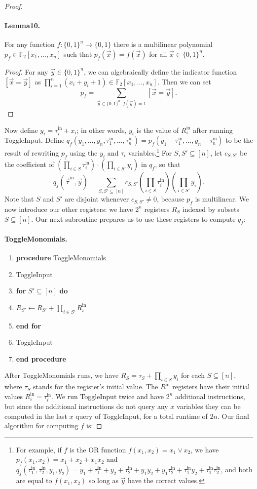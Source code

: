 \begin{proof}
\paragraph{Lemma10.} For any function $f:\{0,1\}^n\to\{0,1\}$ there is a multilinear polynomial $p_f\in\mathbb F_2[x_1,\ldots,x_n]$ such that $p_f(\vec x)=f(\vec x)$ for all $\vec x\in\{0,1\}^n$.
\begin{proof}
For any $\vec y\in\{0,1\}^n$, we can algebraically define the indicator function $[\vec x=\vec y]$ as $\prod_{i=1}^n(x_i+y_i+1)\in\mathbb F_2[x_1,\ldots,x_n]$. Then we can set
\[p_f=\sum_{\vec y\in\{0,1\}^n:f(\vec y)=1}[\vec x=\vec y].\]
\end{proof}
Now define $y_i=\tau_i^{\mathrm{in}}+x_i$; in other words, $y_i$ is the value of $R_i^{\mathrm{in}}$ after running ToggleInput. Define $q_f(y_1,\ldots,y_n,\tau_1^{\mathrm{in}},\ldots,\tau_n^{\mathrm{in}})=p_f(y_1-\tau_1^{\mathrm{in}},\ldots,y_n-\tau_n^{\mathrm{in}})$ to be the result of rewriting $p_f$ using the $y_i$ and $\tau_i$ variables.\footnote{For example, if $f$ is the OR function $f(x_1,x_2)=x_1\lor x_2$, we have $p_f(x_1,x_2)=x_1+x_2+x_1x_2$ and $q_f(\tau_1^{\mathrm{in}},\tau_2^{\mathrm{in}},y_1,y_2)=y_1+\tau_1^{\mathrm{in}}+y_2+\tau_2^{\mathrm{in}}+y_1y_2+y_1\tau_2^{\mathrm{in}}+\tau_1^{\mathrm{in}}y_2+\tau_1^{\mathrm{in}}\tau_2^{\mathrm{in}}$, and both are equal to $f(x_1,x_2)$ so long as $\vec y$ have the correct values.} For $S,S'\subseteq[n]$, let $c_{S,S'}$ be the coefficient of $(\prod_{i\in S}\tau_i^{\mathrm{in}})\cdot(\prod_{i\in S'}y_i)$ in $q_f$, so that
\[q_f(\vec\tau^{\mathrm{in}},\vec y)=\sum_{S,S'\subseteq[n]}c_{S,S'}\left(\prod_{i\in S}\tau_i^{\mathrm{in}}\right)\left(\prod_{i\in S'}y_i\right).\]
Note that $S$ and $S'$ are disjoint whenever $c_{S,S'}\neq0$, because $p_f$ is multilinear. We now introduce our other registers: we have $2^n$ registers $R_S$ indexed by subsets $S\subseteq[n]$. Our next subroutine prepares us to use these registers to compute $q_f$:
\paragraph{ToggleMonomials.}
\begin{enumerate}[label=\arabic*:]
\item \textbf{procedure} ToggleMonomials
\item ToggleInput
\item \textbf{for} $S'\subseteq[n]$ \textbf{do}
\item $R_{S'}\leftarrow R_{S'}+\prod_{i\in S'}R_i^{\mathrm{in}}$
\item \textbf{end for}
\item ToggleInput
\item \textbf{end procedure}
\end{enumerate}
After ToggleMonomials runs, we have $R_S=\tau_S+\prod_{i\in S}y_i$ for each $S\subseteq[n]$, where $\tau_S$ stands for the register's initial value. The $R^{\mathrm{in}}$ registers have their initial values $R_i^{\mathrm{in}}=\tau_i^{\mathrm{in}}$. We run ToggleInput twice and have $2^n$ additional instructions, but since the additional instructions do not query any $x$ variables they can be computed in the last $x$ query of ToggleInput, for a total runtime of $2n$.
Our final algorithm for computing $f$ is:

\end{proof}
